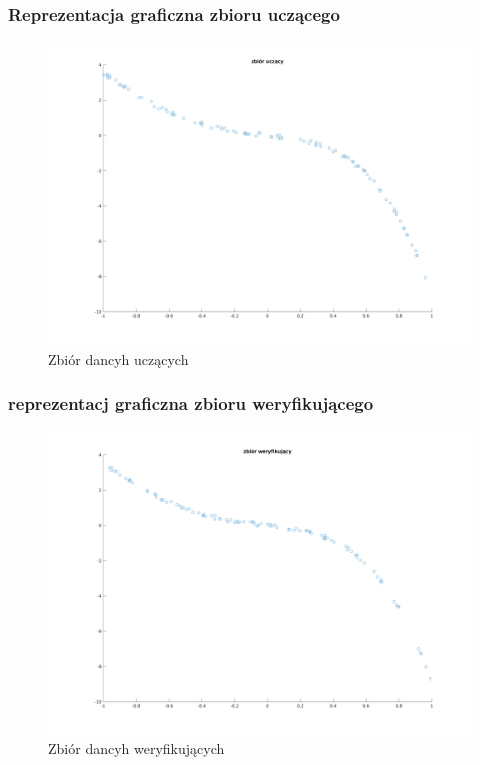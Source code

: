 \documentclass[a4paper, 11pt]{article}
\begin{document}
\subsubsection{Reprezentacja graficzna zbioru uczącego}
\begin{figure}[H]
\centering
\includegraphics[scale=0.50]{dane_stat_ucz.png}
\caption{Zbiór dancyh uczących }
\label{}
\end{figure}
\subsubsection{reprezentacj graficzna zbioru weryfikującego}
\begin{figure}[H]
\centering
\includegraphics[scale=0.50]{dane_stat_wer.png}
\caption{Zbiór dancyh weryfikujących }
\label{}
\end{figure}
\end{document}
